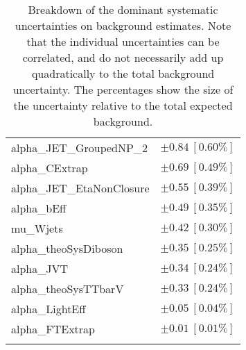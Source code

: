 \begin{table}
\begin{center}
\begin{tabular*}{\textwidth}{@{\extracolsep{\fill}}lc}
alpha\_JET\_GroupedNP\_2         & $\pm 0.84\ [0.60\%] $       \\
alpha\_CExtrap         & $\pm 0.69\ [0.49\%] $       \\
alpha\_JET\_EtaNonClosure         & $\pm 0.55\ [0.39\%] $       \\
alpha\_bEff         & $\pm 0.49\ [0.35\%] $       \\
mu\_Wjets         & $\pm 0.42\ [0.30\%] $       \\
alpha\_theoSysDiboson         & $\pm 0.35\ [0.25\%] $       \\
alpha\_JVT         & $\pm 0.34\ [0.24\%] $       \\
alpha\_theoSysTTbarV         & $\pm 0.33\ [0.24\%] $       \\
alpha\_LightEff         & $\pm 0.05\ [0.04\%] $       \\
alpha\_FTExtrap         & $\pm 0.01\ [0.01\%] $       \\
\noalign{\smallskip}\hline\noalign{\smallskip}
\end{tabular*}
\end{center}
\caption[Breakdown of uncertainty on background estimates]{
Breakdown of the dominant systematic uncertainties on background estimates.
Note that the individual uncertainties can be correlated, and do not necessarily add up quadratically to 
the total background uncertainty. The percentages show the size of the uncertainty relative to the total expected background.
\label{table.results.bkgestimate.uncertainties.VRTopBTT}}
\end{table}
%